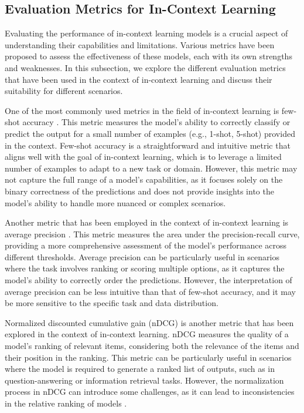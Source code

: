 \documentclass[11pt]{article}
\begin{document}
\subsection{Evaluation Metrics for In-Context Learning}

Evaluating the performance of in-context learning models is a crucial aspect of understanding their capabilities and limitations. Various metrics have been proposed to assess the effectiveness of these models, each with its own strengths and weaknesses. In this subsection, we explore the different evaluation metrics that have been used in the context of in-context learning and discuss their suitability for different scenarios.

One of the most commonly used metrics in the field of in-context learning is few-shot accuracy \cite{ref285}. This metric measures the model's ability to correctly classify or predict the output for a small number of examples (e.g., 1-shot, 5-shot) provided in the context. Few-shot accuracy is a straightforward and intuitive metric that aligns well with the goal of in-context learning, which is to leverage a limited number of examples to adapt to a new task or domain. However, this metric may not capture the full range of a model's capabilities, as it focuses solely on the binary correctness of the predictions and does not provide insights into the model's ability to handle more nuanced or complex scenarios.

Another metric that has been employed in the context of in-context learning is average precision \cite{ref286}. This metric measures the area under the precision-recall curve, providing a more comprehensive assessment of the model's performance across different thresholds. Average precision can be particularly useful in scenarios where the task involves ranking or scoring multiple options, as it captures the model's ability to correctly order the predictions. However, the interpretation of average precision can be less intuitive than that of few-shot accuracy, and it may be more sensitive to the specific task and data distribution.

Normalized discounted cumulative gain (nDCG) \cite{ref287} is another metric that has been explored in the context of in-context learning. nDCG measures the quality of a model's ranking of relevant items, considering both the relevance of the items and their position in the ranking. This metric can be particularly useful in scenarios where the model is required to generate a ranked list of outputs, such as in question-answering or information retrieval tasks. However, the normalization process in nDCG can introduce some challenges, as it can lead to inconsistencies in the relative ranking of models \cite{ref287}.
\end{document}
